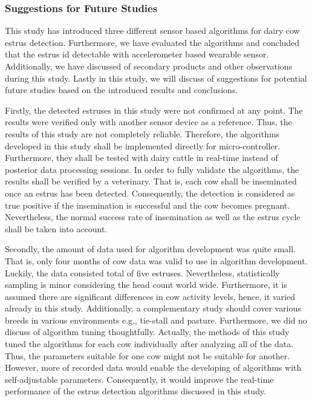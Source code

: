 \documentclass[english,12pt,a4paper,pdftex,elec,utf8]{aaltothesis}
\begin{document}
\subsubsection{Suggestions for Future Studies}

This study has introduced three different sensor based algorithms for dairy cow estrus detection. Furthermore, we have evaluated the algorithms and concluded that the estrus id detectable with accelerometer based wearable sensor. Additionally, we have discussed of secondary products and other observations during this study. Lastly in this study, we will discuss of suggestions for potential future studies based on the introduced results and conclusions.

Firstly, the detected estruses in this study were not confirmed at any point. The results were verified only with another sensor device as a reference. Thus, the results of this study are not completely reliable. Therefore, the algorithms developed in this study shall be implemented directly for micro-controller. Furthermore, they shall be tested with dairy cattle in real-time instead of posterior data processing sessions. In order to fully validate the algorithms, the results shall be verified by a veterinary. That is, each cow shall be inseminated once an estrus has been detected. Consequently, the detection is considered as true positive if the insemination is successful and the cow becomes pregnant.  Nevertheless, the normal success rate of insemination as well as the estrus cycle shall be taken into account.

Secondly, the amount of data used for algorithm development was quite small. That is, only four months of cow data was valid to use in algorithm development. Luckily, the data consisted total of five estruses. Nevertheless, statistically sampling is minor considering the head count world wide. Furthermore, it is assumed there are significant differences in cow activity levels, hence, it varied already in this study. Additionally, a complementary study should cover various breeds in various environments e.g., tie-stall and pasture. Furthermore, we did no discuss of  algorithm tuning thoughtfully. Actually, the methods of this study tuned the algorithms for each cow individually after analyzing all of the data. Thus, the parameters suitable for one cow might not be suitable for another. However, more of recorded data would enable the developing of algorithms with self-adjustable parameters. Consequently, it would improve the real-time performance of the estrus detection algorithms discussed in this study.
\end{document}
